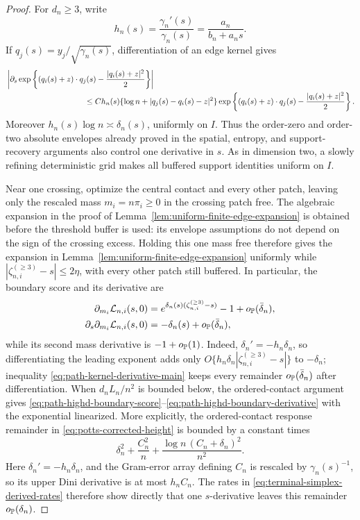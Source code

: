 \begin{proof}
For \(d_n\ge3\), write
\[
 h_n(s)=\frac{\gamma_n'(s)}{\gamma_n(s)}
       =\frac{a_n}{b_n+a_ns}.
\]
If \(q_j(s)=y_j/\sqrt{\gamma_n(s)}\), differentiation of an edge kernel gives
\begin{align}
 &\left|\partial_s
 \exp\left\{(q_i(s)+z)\cdot q_j(s)-\frac{|q_i(s)+z|^2}{2}\right\}\right|
 \notag\\
 &\hspace{35mm}\le
 C h_n(s)\{\log n+|q_j(s)-q_i(s)-z|^2\}
 \exp\left\{(q_i(s)+z)\cdot q_j(s)-\frac{|q_i(s)+z|^2}{2}\right\}.
\label{eq:path-kernel-derivative-main}
\end{align}
Moreover \(h_n(s)\log n\asymp\delta_n(s)\), uniformly on \(I\). Thus the
order-zero and order-two absolute envelopes already proved in the spatial,
entropy, and support-recovery arguments also control one derivative in \(s\).
As in dimension two, a slowly refining deterministic grid makes all buffered
support identities uniform on \(I\).

Near one crossing, optimize the central contact and every other patch, leaving
only the rescaled mass \(m_i=n\pi_i\ge0\) in the crossing patch free. The
algebraic expansion in the proof of
Lemma~\ref{lem:uniform-finite-edge-expansion} is obtained before the threshold
buffer is used: its envelope assumptions do not depend on the sign of the
crossing excess. Holding this one mass free therefore gives the expansion in
Lemma~\ref{lem:uniform-finite-edge-expansion} uniformly while
\(|\zeta_{n,i}^{(\ge3)}-s|\le2\eta\), with every other patch
still buffered. In particular, the boundary score and its derivative are
\begin{align}
 \partial_{m_i}\mathcal L_{n,i}(s,0)
 &=e^{\delta_n(s)(\zeta_{n,i}^{(\ge3)}-s)}-1
   +o_{\mathbb P}(\bar\delta_n),
\label{eq:path-highd-boundary-score}\\
 \partial_s\partial_{m_i}\mathcal L_{n,i}(s,0)
 &=-\delta_n(s)+o_{\mathbb P}(\bar\delta_n),
\label{eq:path-highd-boundary-derivative}
\end{align}
while its second mass derivative is \(-1+o_{\mathbb P}(1)\). Indeed,
\(\delta_n'=-h_n\delta_n\), so differentiating the leading exponent adds
only \(O\{h_n\delta_n|\zeta_{n,i}^{(\ge3)}-s|\}\) to
\(-\delta_n\); inequality \eqref{eq:path-kernel-derivative-main} keeps every
remainder \(o_{\mathbb P}(\bar\delta_n)\) after differentiation. When
\(d_nL_n/n^2\) is bounded below, the ordered-contact argument gives
\eqref{eq:path-highd-boundary-score}--\eqref{eq:path-highd-boundary-derivative}
with the exponential linearized. More explicitly, the ordered-contact
response remainder in
\eqref{eq:potts-corrected-height} is bounded by a constant times
\[
 \delta_n^2+\frac{C_n^2}{n}
 +\frac{\log n\,(C_n+\delta_n)^2}{n^2}.
\]
Here \(\delta_n'=-h_n\delta_n\), and the Gram-error array defining \(C_n\)
is rescaled by \(\gamma_n(s)^{-1}\), so its upper Dini derivative is at most
\(h_nC_n\). The rates in \eqref{eq:terminal-simplex-derived-rates} therefore
show directly that one \(s\)-derivative leaves this remainder
\(o_{\mathbb P}(\delta_n)\).


\end{proof}

